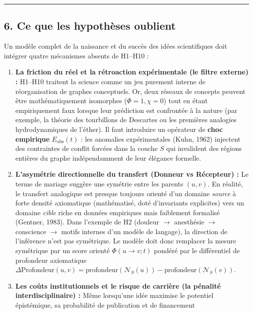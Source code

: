 \documentclass[a4paper,11pt]{article}
\providecommand{\tightlist}{\setlength{\itemsep}{0pt}\setlength{\parskip}{0pt}}
\begin{document}
\begin{center}\rule{0.5\linewidth}{0.5pt}\end{center}

\subsection*{6. Ce que les hypothèses oublient}

Un modèle complet de la naissance et du succès des idées scientifiques
doit intégrer quatre mécanismes absents de H1--H10 :

\begin{enumerate}
\def\labelenumi{\arabic{enumi}.}
\tightlist
\item
  \textbf{La friction du réel et la rétroaction expérimentale (le filtre
  externe) :} H1--H10 traitent la science comme un jeu purement interne
  de réorganisation de graphes conceptuels. Or, deux réseaux de concepts
  peuvent être mathématiquement isomorphes (\(\Phi = 1, \chi = 0\)) tout
  en étant empiriquement faux lorsque leur prédiction est confrontée à
  la nature (par exemple, la théorie des tourbillons de Descartes ou les
  premières analogies hydrodynamiques de l'éther). Il faut introduire un
  opérateur de \textbf{choc empirique} \(E_{\text{obs}}(t)\) : les
  anomalies expérimentales (Kuhn, 1962) injectent des contraintes de
  conflit forcées dans la couche \(S\) qui invalident des régions
  entières du graphe indépendamment de leur élégance formelle.
\item
  \textbf{L'asymétrie directionnelle du transfert (Donneur vs Récepteur)
  :} Le terme de mariage suggère une symétrie entre les parents
  \((u,v)\). En réalité, le transfert analogique est presque toujours
  orienté d'un domaine \emph{source} à forte densité axiomatique
  (mathématisé, doté d'invariants explicites) vers un domaine
  \emph{cible} riche en données empiriques mais faiblement formalisé
  (Gentner, 1983). Dans l'exemple de H2 (douleur \(\to\) anesthésie
  \(\to\) conscience \(\to\) motifs internes d'un modèle de langage), la
  direction de l'inférence n'est pas symétrique. Le modèle doit donc
  remplacer la mesure symétrique par un score orienté
  \(\Phi(u \to v; t)\) pondéré par le différentiel de profondeur
  axiomatique
  \(\Delta \text{Profondeur}(u,v) = \text{profondeur}(\mathcal{N}_S(u)) - \text{profondeur}(\mathcal{N}_S(v))\).
\item
  \textbf{Les coûts institutionnels et le risque de carrière (la
  pénalité interdisciplinaire) :} Même lorsqu'une idée maximise le
  potentiel épistémique, sa probabilité de publication et de financement

\end{enumerate}
\end{document}
